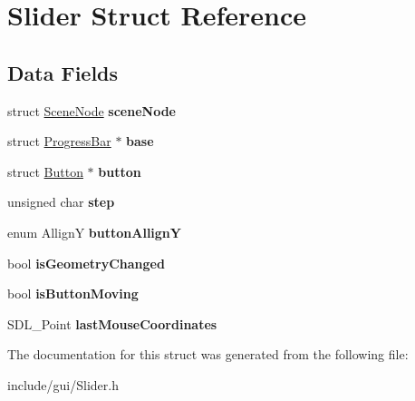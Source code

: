 \hypertarget{struct_slider}{}\section{Slider Struct Reference}
\label{struct_slider}
\subsection*{Data Fields}
\begin{DoxyCompactItemize}
\item 
\hypertarget{struct_slider_aca8025f56fb4ce20b974ec9a3292a9e4}{}\label{struct_slider_aca8025f56fb4ce20b974ec9a3292a9e4} 
struct \hyperlink{struct_scene_node}{Scene\+Node} {\bfseries scene\+Node}
\item 
\hypertarget{struct_slider_a686905c1a3f09ace5f334088ada4ee71}{}\label{struct_slider_a686905c1a3f09ace5f334088ada4ee71} 
struct \hyperlink{struct_progress_bar}{Progress\+Bar} $\ast$ {\bfseries base}
\item 
\hypertarget{struct_slider_ae7aee5d2fea3fa9c160fcb9341275053}{}\label{struct_slider_ae7aee5d2fea3fa9c160fcb9341275053} 
struct \hyperlink{struct_button}{Button} $\ast$ {\bfseries button}
\item 
\hypertarget{struct_slider_ae3ee46455ae318e5d8b789e5b47d2d58}{}\label{struct_slider_ae3ee46455ae318e5d8b789e5b47d2d58} 
unsigned char {\bfseries step}
\item 
\hypertarget{struct_slider_acc6bbbef7fde96fcba69e9befa298799}{}\label{struct_slider_acc6bbbef7fde96fcba69e9befa298799} 
enum AllignY {\bfseries button\+AllignY}
\item 
\hypertarget{struct_slider_a8ea7e8ac3e3330830aa7a4309390f3ac}{}\label{struct_slider_a8ea7e8ac3e3330830aa7a4309390f3ac} 
bool {\bfseries is\+Geometry\+Changed}
\item 
\hypertarget{struct_slider_a5046816c8ca0b6b9c5948de82c1cbc44}{}\label{struct_slider_a5046816c8ca0b6b9c5948de82c1cbc44} 
bool {\bfseries is\+Button\+Moving}
\item 
\hypertarget{struct_slider_a521d68392d4b01394621624b94ce06f7}{}\label{struct_slider_a521d68392d4b01394621624b94ce06f7} 
S\+D\+L\+\_\+\+Point {\bfseries last\+Mouse\+Coordinates}
\end{DoxyCompactItemize}


The documentation for this struct was generated from the following file\+:\begin{DoxyCompactItemize}
\item 
include/gui/Slider.\+h\end{DoxyCompactItemize}
